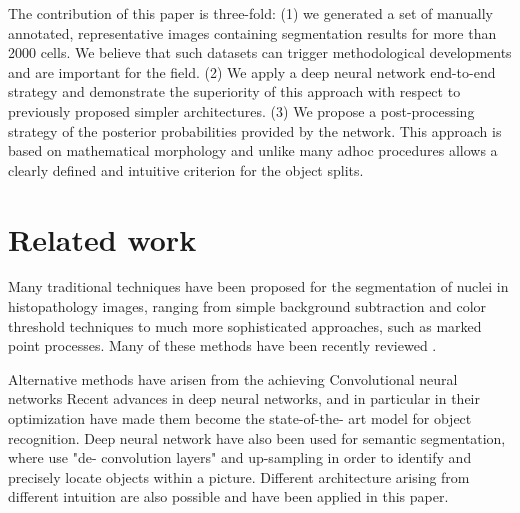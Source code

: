 \documentclass{article}
\begin{document}
The contribution of this paper is three-fold: (1) we generated a
set of manually annotated, representative images containing segmentation results for
more than 2000 cells. We believe that such datasets
can trigger methodological developments and are
important for the field. (2) We apply a deep neural network end-to-end strategy and
demonstrate the superiority of this approach with respect to
previously proposed simpler architectures. (3) We propose a
post-processing strategy of the posterior probabilities provided by
the network. This approach is based on mathematical
morphology and unlike many adhoc procedures allows a clearly defined
and intuitive criterion for the object splits.

\section{Related work}
\label{sec:related}

\noindent Many traditional techniques have been proposed for the segmentation of
nuclei in histopathology images, ranging from simple background
subtraction and color threshold techniques \cite{Yuan2012} 
to much more
sophisticated approaches, such as marked point
processes\cite{Kulikova2012}. Many of these methods have been recently
reviewed \cite{irshad2014methods}.    


Alternative methods 
have arisen from the achieving Convolutional neural networks 
Recent advances in deep neural networks, and in 
particular in their optimization have made them become the state-of-the-
art model for object recognition.  Deep neural network have also been 
used for 
semantic segmentation, where \cite{long2015fcn} use "de-
convolution layers" and up-sampling in order to identify and precisely 
locate objects within a picture. Different architecture arising from 
different intuition are also possible and have been applied in this paper.
\end{document}
